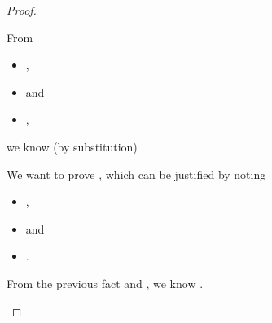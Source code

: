\begin{lemma}
\begin{proof}
\begin{case}[B-BetaClosure]
\begin{itemize}
\begin{subcase}[T-App]
          From 
          \begin{itemize}
            \item
              ,
            \item
  \judgementrewrite {\propenv{}}
                 {} {\s{}}
                 {
                             {}}
                 {}
                 {} and 
            \item
  \opsem {\openv{}}
         {}
         {},
     \end{itemize}
              we know (by substitution)
              .

              We want to prove
        \judgementrewrite {\propenvc{}}
                          {}
                          {}
               {}
                          {}
                          {}, 
                          which can be justified by noting 
          \begin{itemize}
            \item
  ,
            \item
  \judgementrewrite {\propenv{}}
                 {} {\s{}}
                 {
                             {}}
                 {}
                 {} and 
            \item
  \opsem {\openv{}}
         {}
         {}.
     \end{itemize}

     From the previous fact and ,
              we know
         {}
         {\val{}}.


\end{subcase}
\end{itemize}
\end{case}
\end{proof}
\end{lemma}
